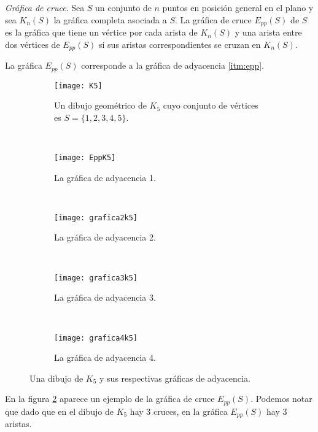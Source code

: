 \begin{definition}{\emph{Gráfica de cruce}.}
  Sea $S$ un conjunto de $n$ puntos en posición general en el plano y sea
  $K_n(S)$ la gráfica completa  asociada a $S$. La gráfica de cruce $E_{pp}(S)$
  de $S$ es la gráfica que tiene un vértice por cada arista de $K_n(S)$ y una
  arista entre dos vértices de $E_{pp}(S)$ si sus aristas correspondientes se
  cruzan en $K_n(S)$.
\end{definition}

La gráfica $E_{pp}(S)$ corresponde a la gráfica de adyacencia \ref{itm:epp}.
\begin{figure}
\begin{subfigure}{.5\textwidth}
  \centering
  \texttt{[image: K5]}
  \caption{Un dibujo geométrico de $K_5$ cuyo conjunto de vértices es $S=\{1,2,3,4,5\}$.}
  \label{fig:k5}
\end{subfigure}%
~
\begin{subfigure}{.5\textwidth}
  \centering
  \texttt{[image: EppK5]}
  \caption{La gráfica de adyacencia 1.}
  \label{fig:eppk5}
\end{subfigure}
~
\begin{subfigure}{.5\textwidth}
  \centering
  \texttt{[image: grafica2k5]}
  \caption{La gráfica de adyacencia 2.}
  \label{fig:2k5}
\end{subfigure}
~
\begin{subfigure}{.5\textwidth}
  \centering
  \texttt{[image: grafica3k5]}
  \caption{La gráfica de adyacencia 3.}
  \label{fig:3k5}
\end{subfigure}
~
\begin{subfigure}{.5\textwidth}
  \centering
  \texttt{[image: grafica4k5]}
  \caption{La gráfica de adyacencia 4.}
  \label{fig:4k5}
\end{subfigure}
\caption{Una dibujo de $K_5$ y sus respectivas gráficas de adyacencia.}
\label{fig:ejemploeppk5}
\end{figure}

En la figura \ref{fig:eppk5} aparece un ejemplo de la gráfica de cruce
$E_{pp}(S)$. Podemos notar que dado que en el dibujo de $K_5$ hay 3 cruces, en
la gráfica $E_{pp}(S)$ hay 3 aristas.

